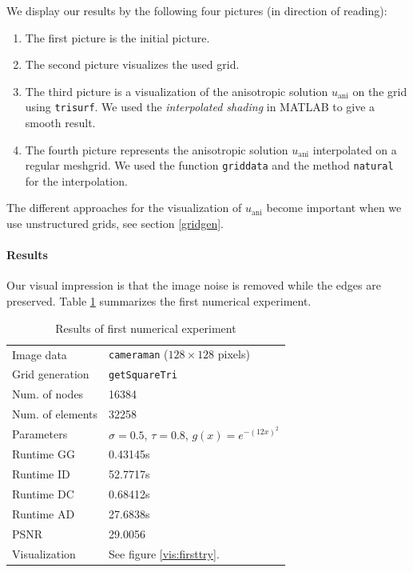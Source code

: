 \documentclass{report}
\def\ani{\text{ani}}
\begin{document}
We display our results by the following four pictures (in direction of reading):
\begin{enumerate}
	\item 
	The first picture is the initial picture.
	\item
	The second picture visualizes the used grid.
	\item
	The third picture is a visualization of the anisotropic solution $u_\ani$ on the grid using \texttt{trisurf}. We used the \emph{interpolated shading} in MATLAB to give a smooth result.
	\item
	The fourth picture represents the anisotropic solution $u_\ani$ interpolated on a regular meshgrid. We used the function \texttt{griddata} and the method \texttt{natural} for the interpolation.
\end{enumerate}
The different approaches for the visualization of $u_\ani$ become important when we use unstructured grids, see section \ref{gridgen}.

\paragraph{Results}

Our visual impression is that the image noise is removed while the edges are preserved. Table \ref{res:firsttry} summarizes the first numerical experiment.

\begin{table}[h]
	\centering
	\begin{tabular}{|ll}
		Image data & \texttt{cameraman} ($128 \times 128$ pixels) \\
		Grid generation & \texttt{getSquareTri} \\
		Num. of nodes & 16384\\
		Num. of elements & 32258\\
		Parameters & $\sigma=0.5$, $\tau=0.8$, $g(x) = e^{-(12 x)^2}$ \\
		Runtime GG & 0.43145s \\
		Runtime ID & 52.7717s \\
		Runtime DC & 0.68412s \\
		Runtime AD & 27.6838s\\
		PSNR & 29.0056 \\
		Visualization & See figure \ref{vis:firsttry}. \\
	\end{tabular}
	\caption{Results of first numerical experiment}
	\label{res:firsttry}
\end{table}
\end{document}
